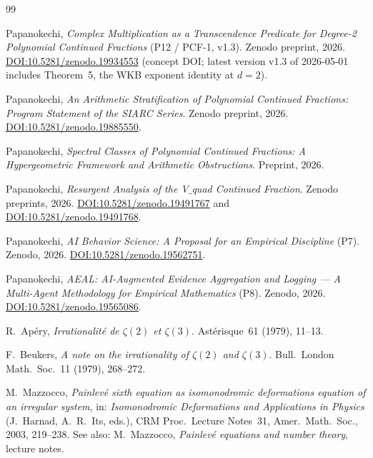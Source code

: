 \documentclass[11pt,a4paper]{article}
\theoremstyle{definition}
\theoremstyle{remark}
\begin{document}
\begin{thebibliography}{99}

Papanokechi, \emph{Complex Multiplication as a Transcendence Predicate
for Degree-2 Polynomial Continued Fractions} (P12 / PCF-1, v1.3).
Zenodo preprint, 2026.
\href{https://doi.org/10.5281/zenodo.19934553}
{DOI:10.5281/zenodo.19934553} (concept DOI; latest version v1.3 of
2026-05-01 includes Theorem~5, the WKB exponent identity at $d=2$).

Papanokechi, \emph{An Arithmetic Stratification of Polynomial Continued
Fractions: Program Statement of the SIARC Series}.
Zenodo preprint, 2026.
\href{https://doi.org/10.5281/zenodo.19885550}
{DOI:10.5281/zenodo.19885550}.

Papanokechi, \emph{Spectral Classes of Polynomial Continued Fractions:
A Hypergeometric Framework and Arithmetic Obstructions}.
Preprint, 2026.

Papanokechi, \emph{Resurgent Analysis of the V$\_$quad Continued
Fraction}.
Zenodo preprints, 2026.
\href{https://doi.org/10.5281/zenodo.19491767}
{DOI:10.5281/zenodo.19491767} and
\href{https://doi.org/10.5281/zenodo.19491768}
{DOI:10.5281/zenodo.19491768}.

Papanokechi, \emph{AI Behavior Science: A Proposal for an Empirical
Discipline} (P7). Zenodo, 2026.
\href{https://doi.org/10.5281/zenodo.19562751}
{DOI:10.5281/zenodo.19562751}.

Papanokechi, \emph{AEAL: AI-Augmented Evidence Aggregation and
Logging --- A Multi-Agent Methodology for Empirical Mathematics} (P8).
Zenodo, 2026.
\href{https://doi.org/10.5281/zenodo.19565086}
{DOI:10.5281/zenodo.19565086}.

R.~Ap\'ery, \emph{Irrationalit\'e de $\zeta(2)$ et $\zeta(3)$}.
Ast\'erisque~61 (1979), 11--13.

F.~Beukers, \emph{A note on the irrationality of $\zeta(2)$ and
$\zeta(3)$}. Bull.~London Math.~Soc.~11 (1979), 268--272.

M.~Mazzocco, \emph{Painlev\'e sixth equation as isomonodromic deformations
equation of an irregular system}, in: \emph{Isomonodromic Deformations and
Applications in Physics} (J.~Harnad, A.~R.~Its, eds.),
CRM Proc.~Lecture Notes~31, Amer.~Math.~Soc., 2003, 219--238.
See also: M.~Mazzocco, \emph{Painlev\'e equations and number theory},
lecture notes.


\end{thebibliography}
\end{document}
